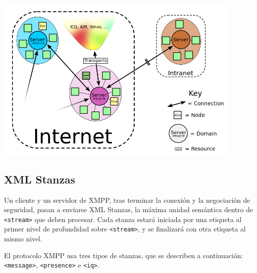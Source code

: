 \documentclass[a4paper, 11pt]{article} %
\begin{document}
      \begin{center}
      \includegraphics[width=12cm]{network.png}
      \end{center}
      
    
  \subsection{XML Stanzas}
    Un cliente y un servidor de XMPP, tras terminar la conexión y la negociación de seguridad,
    pasan a enviarse XML Stanzas, la máxima unidad semántica dentro de \texttt{<stream>} que deben procesar.
    Cada stanza estará iniciada por una etiqueta al primer nivel de profundidad sobre \texttt{<stream>},
    y se finalizará con otra etiqueta al mismo nivel.
    
    El protocolo XMPP usa tres tipos de stanzas, que se describen a continuación: \texttt{<message>}, \texttt{<presence>}
    e \texttt{<iq>}.
  
\end{document}
